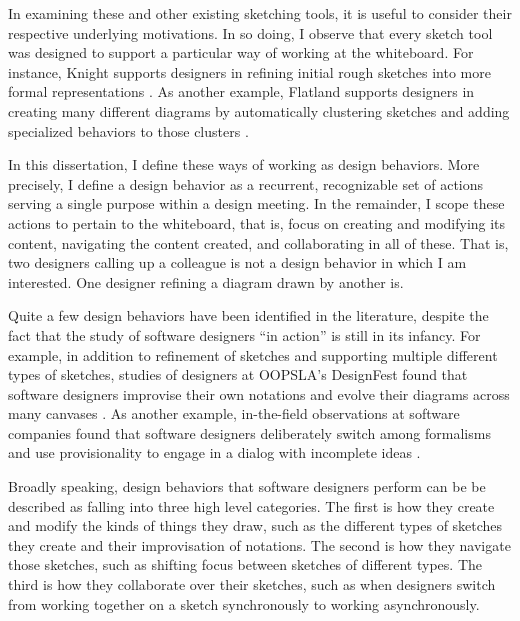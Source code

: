 \documentclass[12pt,fleqn]{ucithesis}
\begin{document}
In examining these and other existing sketching tools, it is useful to consider their respective underlying motivations. In so doing, I observe that every sketch tool was designed to support a particular way of working at the whiteboard. For instance, Knight supports designers in refining initial rough sketches into more formal representations \cite{damm2000supporting}. As another example, Flatland supports designers in creating many different diagrams by automatically clustering sketches and adding specialized behaviors to those clusters \cite{mynatt1999flatland}.

In this dissertation, I define these ways of working as design behaviors. More precisely, I define a design behavior as a recurrent, recognizable set of actions serving a single purpose within a design meeting. In the remainder, I scope these actions to pertain to the whiteboard, that is, focus on creating and modifying its content, navigating the content created, and collaborating in all of these. That is, two designers calling up a colleague is not a design behavior in which I am interested.  One designer refining a diagram drawn by another is.

Quite a few design behaviors have been identified in the literature, despite the fact that the study of software designers ``in action'' is still in its infancy. For example, in addition to refinement of sketches and supporting multiple different types of sketches, studies of designers at OOPSLA’s DesignFest found that software designers improvise their own notations and evolve their diagrams across many canvases \cite{dekel2007notation}. As another example, in-the-field observations at software companies found that software designers deliberately switch among formalisms and use provisionality to engage in a dialog with incomplete ideas \cite{petre2009insights}. 

Broadly speaking, design behaviors that software designers perform can be be described as falling into three high level categories. The  first is how they create and modify the kinds of things they draw, such as the different types of sketches they create and their improvisation of notations. The second is how they navigate those sketches, such as shifting focus between sketches of different types. The third is how they collaborate over their sketches, such as when designers switch from working together on a sketch synchronously to working asynchronously. 
\end{document}
